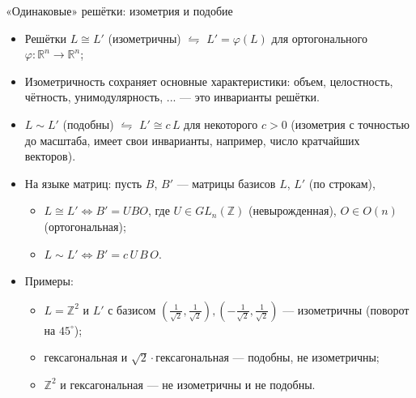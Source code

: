 \documentclass[serif, aspectratio=169]{beamer}
\begin{document}
\begin{frame}{«Одинаковые» решётки: изометрия и подобие}
    \begin{itemize}
        \item Решётки $L\cong L'$ (изометричны) $\leftrightharpoons$ $L'=\varphi(L)$ для ортогонального $\varphi:\mathbb{R}^n\to\mathbb{R}^n$;
        \item Изометричность сохраняет основные характеристики: объем, целостность, чётность, унимодулярность, ... --- это инварианты решётки.
        \item $L\sim L'$ (подобны) $\leftrightharpoons$ $L'\cong c\,L$ для некоторого $c>0$ (изометрия с точностью до масштаба, имеет свои инварианты, например, число кратчайших векторов).
        \item На языке матриц: пусть $B$, $B'$ --- матрицы базисов $L$, $L'$ (по строкам),
        \begin{itemize}
            \item $L\cong L' \Leftrightarrow B'=UBO$, где $U\in GL_n(\mathbb{Z})$ (невырожденная), $O\in O(n)$ (ортогональная);
            \item $L\sim L' \Leftrightarrow B'=c\,U\,B\,O$.
        \end{itemize}
        \item Примеры:
        \begin{itemize}
            \item $L=\mathbb{Z}^2$ и $L'$ с базисом $(\frac{1}{\sqrt2},\frac{1}{\sqrt2}),(-\frac{1}{\sqrt2},\frac{1}{\sqrt2})$ --- изометричны (поворот на $45^\circ$);
            \item гексагональная и $\sqrt2\cdot$гексагональная --- подобны, не изометричны;
            \item $\mathbb{Z}^2$ и гексагональная --- не изометричны и не подобны.
        \end{itemize}
    \end{itemize}
\end{frame}
\end{document}
